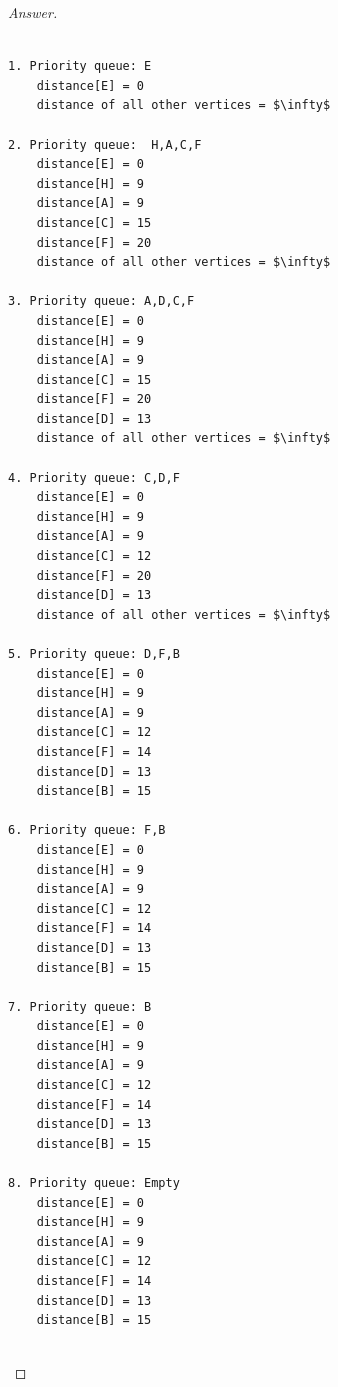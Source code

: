 \documentclass[11pt]{article}
\theoremstyle{definition}
\theoremstyle{definition}
\theoremstyle{definition}
\begin{document}
\begin{proof}[Answer]
\begin{enumerate}
\begin{lstlisting}

1. Priority queue: E
    distance[E] = 0
    distance of all other vertices = $\infty$
    
2. Priority queue:  H,A,C,F 
    distance[E] = 0
    distance[H] = 9 
    distance[A] = 9 
    distance[C] = 15
    distance[F] = 20 
    distance of all other vertices = $\infty$

3. Priority queue: A,D,C,F
    distance[E] = 0
    distance[H] = 9 
    distance[A] = 9 
    distance[C] = 15
    distance[F] = 20 
    distance[D] = 13
    distance of all other vertices = $\infty$
    
4. Priority queue: C,D,F
    distance[E] = 0
    distance[H] = 9 
    distance[A] = 9 
    distance[C] = 12
    distance[F] = 20 
    distance[D] = 13
    distance of all other vertices = $\infty$
    
5. Priority queue: D,F,B
    distance[E] = 0
    distance[H] = 9 
    distance[A] = 9 
    distance[C] = 12
    distance[F] = 14
    distance[D] = 13
    distance[B] = 15
    
6. Priority queue: F,B
    distance[E] = 0
    distance[H] = 9 
    distance[A] = 9 
    distance[C] = 12
    distance[F] = 14
    distance[D] = 13
    distance[B] = 15

7. Priority queue: B
    distance[E] = 0
    distance[H] = 9 
    distance[A] = 9 
    distance[C] = 12
    distance[F] = 14
    distance[D] = 13
    distance[B] = 15
    
8. Priority queue: Empty
    distance[E] = 0
    distance[H] = 9 
    distance[A] = 9 
    distance[C] = 12
    distance[F] = 14
    distance[D] = 13
    distance[B] = 15
    

\end{lstlisting}

\end{enumerate}
\end{proof}





\newpage
\end{document}
